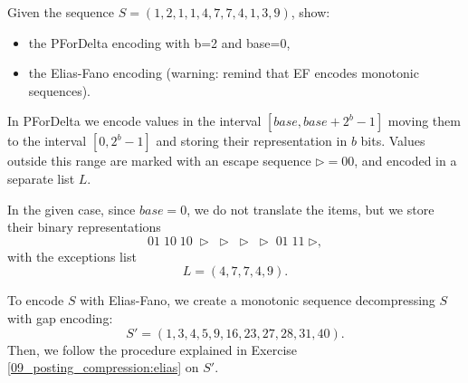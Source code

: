 \exercise

Given the sequence $S = (1, 2, 1, 1, 4, 7, 7, 4, 1, 3, 9)$, show:
%
\begin{itemize}
  \item the PForDelta encoding with b=2 and base=0,
  \item the Elias-Fano encoding (warning: remind that EF encodes monotonic
    sequences).
\end{itemize}

\solution

In PForDelta we encode values in the interval $[base,base+2^b-1]$ moving
them to the interval $[0, 2^b-1]$ and storing their representation in $b$ bits.
Values outside this range are marked with an escape sequence
$\triangleright=00$, and encoded in a separate list $L$.

In the given case, since $base=0$, we do not translate the items, but we store
their binary representations
%
$$01\;10\;10\;\triangleright\;\triangleright\;\triangleright\;\triangleright\;01
\;11\;\triangleright,$$
%
with the exceptions list
$$L=(4,7,7,4,9).$$

To encode $S$ with Elias-Fano, we create a monotonic sequence decompressing $S$
with gap encoding:
%
$$S'=(1,3,4,5,9,16,23,27,28,31,40).$$
%
Then, we follow the procedure explained in Exercise 
\ref{09_posting_compression:elias} on $S'$.